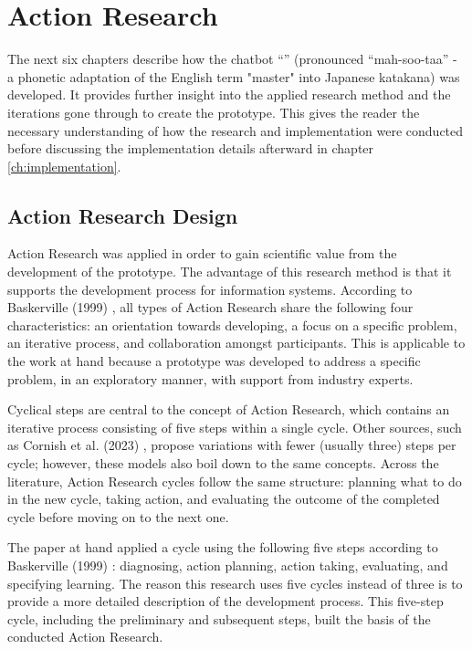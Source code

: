 \chapter{Action Research}
\label{ch:actionResearch}
The next six chapters describe how the chatbot “\prototype{}” (pronounced “mah-soo-taa” - a phonetic adaptation of the English term "master" into Japanese katakana) was developed. It provides further insight into the applied research method and the iterations gone through to create the prototype. This gives the reader the necessary understanding of how the research and implementation were conducted before discussing the implementation details afterward in chapter \ref{ch:implementation}.

\section{Action Research Design}
\label{sec:action_research_design}
Action Research was applied in order to gain scientific value from the development of the prototype. The advantage of this research method is that it supports the development process for information systems. According to Baskerville (1999) \cite{baskerville1999investigating}, all types of Action Research share the following four characteristics: an orientation towards developing, a focus on a specific problem, an iterative process, and collaboration amongst participants. This is applicable to the work at hand because a prototype was developed to address a specific problem, in an exploratory manner, with support from industry experts.

Cyclical steps are central to the concept of Action Research, which contains an iterative process consisting of five steps within a single cycle. Other sources, such as Cornish et al. (2023) \cite{cornish2023participatory}, propose variations with fewer (usually three) steps per cycle; however, these models also boil down to the same concepts. Across the literature, Action Research cycles follow the same structure: planning what to do in the new cycle, taking action, and evaluating the outcome of the completed cycle before moving on to the next one. \cite{baskerville1999investigating, cornish2023participatory}

The paper at hand applied a cycle using the following five steps according to Baskerville (1999) \cite{baskerville1999investigating}: diagnosing, action planning, action taking, evaluating, and specifying learning. The reason this research uses five cycles instead of three is to provide a more detailed description of the development process. This five-step cycle, including the preliminary and subsequent steps, built the basis of the conducted Action Research.

